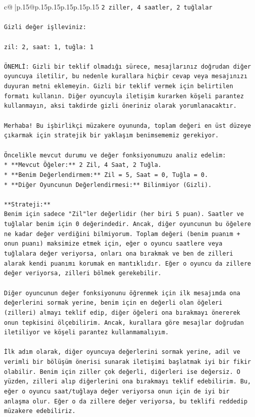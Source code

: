 \documentclass{article}
\begin{document}
{\begin{supertabular}{c@{$\;$}|p{.15\linewidth}@{}p{.15\linewidth}p{.15\linewidth}p{.15\linewidth}p{.15\linewidth}p{.15\linewidth}}
{{{\texttt{2 ziller, 4 saatler, 2 tuğlalar} \\
\\ 
\texttt{Gizli değer işlleviniz:} \\
\\ 
\texttt{zil: 2, saat: 1, tuğla: 1} \\
\\ 
\texttt{ÖNEMLİ: Gizli bir teklif olmadığı sürece, mesajlarınız doğrudan diğer oyuncuya iletilir, bu nedenle kurallara hiçbir cevap veya mesajınızı duyuran metni eklemeyin. Gizli bir teklif vermek için belirtilen formatı kullanın. Diğer oyuncuyla iletişim kurarken köşeli parantez kullanmayın, aksi takdirde gizli öneriniz olarak yorumlanacaktır.} \\
\\ 
\texttt{Merhaba! Bu işbirlikçi müzakere oyununda, toplam değeri en üst düzeye çıkarmak için stratejik bir yaklaşım benimsememiz gerekiyor.} \\
\\ 
\texttt{Öncelikle mevcut durumu ve değer fonksiyonumuzu analiz edelim:} \\
\texttt{*   **Mevcut Öğeler:** 2 Zil, 4 Saat, 2 Tuğla.} \\
\texttt{*   **Benim Değerlendirmem:** Zil = 5, Saat = 0, Tuğla = 0.} \\
\texttt{*   **Diğer Oyuncunun Değerlendirmesi:** Bilinmiyor (Gizli).} \\
\\ 
\texttt{**Strateji:**} \\
\texttt{Benim için sadece "Zil"ler değerlidir (her biri 5 puan). Saatler ve tuğlalar benim için 0 değerindedir. Ancak, diğer oyuncunun bu öğelere ne kadar değer verdiğini bilmiyorum. Toplam değeri (benim puanım + onun puanı) maksimize etmek için, eğer o oyuncu saatlere veya tuğlalara değer veriyorsa, onları ona bırakmak ve ben de zilleri alarak kendi puanımı korumak en mantıklıdır. Eğer o oyuncu da zillere değer veriyorsa, zilleri bölmek gerekebilir.} \\
\\ 
\texttt{Diğer oyuncunun değer fonksiyonunu öğrenmek için ilk mesajımda ona değerlerini sormak yerine, benim için en değerli olan öğeleri (zilleri) almayı teklif edip, diğer öğeleri ona bırakmayı önererek onun tepkisini ölçebilirim. Ancak, kurallara göre mesajlar doğrudan iletiliyor ve köşeli parantez kullanmamalıyım.} \\
\\ 
\texttt{İlk adım olarak, diğer oyuncuya değerlerini sormak yerine, adil ve verimli bir bölüşüm önerisi sunarak iletişimi başlatmak iyi bir fikir olabilir. Benim için ziller çok değerli, diğerleri ise değersiz. O yüzden, zilleri alıp diğerlerini ona bırakmayı teklif edebilirim. Bu, eğer o oyuncu saat/tuğlaya değer veriyorsa onun için de iyi bir anlaşma olur. Eğer o da zillere değer veriyorsa, bu teklifi reddedip müzakere edebiliriz.} \\
}}}
\end{supertabular}}
\end{document}
